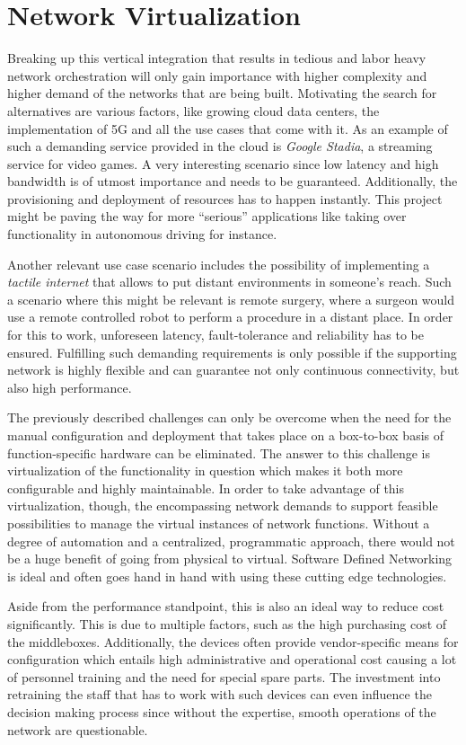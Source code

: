 \section{Network Virtualization}
\label{sec:networkV}
Breaking up this vertical integration that results in tedious and labor heavy network orchestration will only gain importance with higher complexity and higher demand of the networks that are being built. Motivating the search for alternatives are various factors, like growing cloud data centers, the implementation of 5G and all the use cases that come with it. As an example of such a demanding service provided in the cloud is \textit{Google Stadia}, a streaming service for video games. A very interesting scenario since low latency and high bandwidth is of utmost importance and needs to be guaranteed. Additionally, the provisioning and deployment of resources has to happen instantly. This project might be paving the way for more ``serious'' applications like taking over functionality in autonomous driving for instance. 

Another relevant use case scenario includes the possibility of implementing a \textit{tactile internet} that allows to put distant environments in someone's reach. Such a scenario where this might be relevant is remote surgery, where a surgeon would use a remote controlled robot to perform a procedure in a distant place. In order for this to work, unforeseen latency, fault-tolerance and reliability has to be ensured. Fulfilling such demanding requirements is only possible if the supporting network is highly flexible and can guarantee not only continuous connectivity, but also high performance. 

The previously described challenges can only be overcome when the need for the manual configuration and deployment that takes place on a box-to-box basis of function-specific hardware can be eliminated. The answer to this challenge is virtualization of the functionality in question which makes it both more configurable and highly maintainable. In order to take advantage of this virtualization, though, the encompassing network demands to support feasible possibilities to manage the virtual instances of network functions. Without a degree of automation and a centralized, programmatic approach, there would not be a huge benefit of going from physical to virtual. Software Defined Networking is ideal and often goes hand in hand with using these cutting edge technologies.

Aside from the performance standpoint, this is also an ideal way to reduce cost significantly. This is due to multiple factors, such as the high purchasing cost of the middleboxes. Additionally, the devices often provide vendor-specific means for configuration which entails high administrative and operational cost causing a lot of personnel training and the need for special spare parts. The investment into retraining the staff that has to work with such devices can even influence the decision making process since without the expertise, smooth operations of the network are questionable. 

